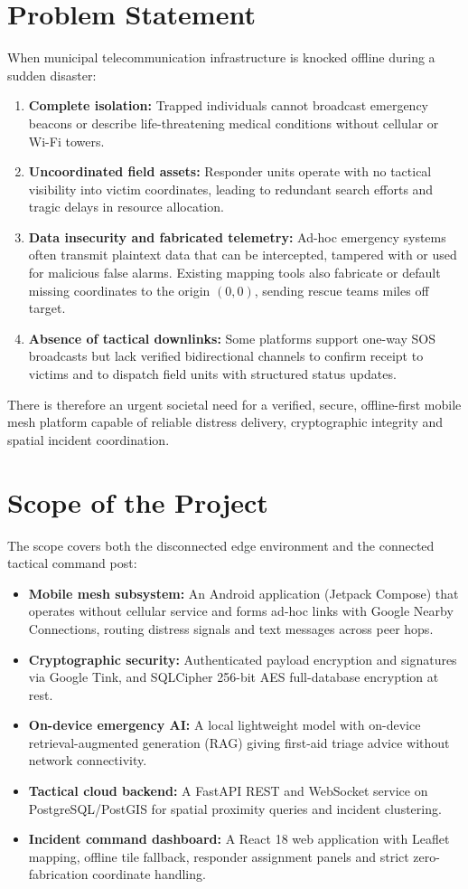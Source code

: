 \documentclass[12pt,a4paper]{report}
\begin{document}
\section{Problem Statement}
When municipal telecommunication infrastructure is knocked offline during a sudden disaster:
\begin{enumerate}
    \item \textbf{Complete isolation:} Trapped individuals cannot broadcast emergency beacons or describe life-threatening medical conditions without cellular or Wi-Fi towers.
    \item \textbf{Uncoordinated field assets:} Responder units operate with no tactical visibility into victim coordinates, leading to redundant search efforts and tragic delays in resource allocation.
    \item \textbf{Data insecurity and fabricated telemetry:} Ad-hoc emergency systems often transmit plaintext data that can be intercepted, tampered with or used for malicious false alarms. Existing mapping tools also fabricate or default missing coordinates to the origin $(0,0)$, sending rescue teams miles off target.
    \item \textbf{Absence of tactical downlinks:} Some platforms support one-way SOS broadcasts but lack verified bidirectional channels to confirm receipt to victims and to dispatch field units with structured status updates.
\end{enumerate}
There is therefore an urgent societal need for a verified, secure, offline-first mobile mesh platform capable of reliable distress delivery, cryptographic integrity and spatial incident coordination.

\section{Scope of the Project}
The scope covers both the disconnected edge environment and the connected tactical command post:
\begin{itemize}
    \item \textbf{Mobile mesh subsystem:} An Android application (Jetpack Compose) that operates without cellular service and forms ad-hoc links with Google Nearby Connections, routing distress signals and text messages across peer hops.
    \item \textbf{Cryptographic security:} Authenticated payload encryption and signatures via Google Tink, and SQLCipher 256-bit AES full-database encryption at rest.
    \item \textbf{On-device emergency AI:} A local lightweight model with on-device retrieval-augmented generation (RAG) giving first-aid triage advice without network connectivity.
    \item \textbf{Tactical cloud backend:} A FastAPI REST and WebSocket service on PostgreSQL/PostGIS for spatial proximity queries and incident clustering.
    \item \textbf{Incident command dashboard:} A React 18 web application with Leaflet mapping, offline tile fallback, responder assignment panels and strict zero-fabrication coordinate handling.
\end{itemize}
\end{document}
